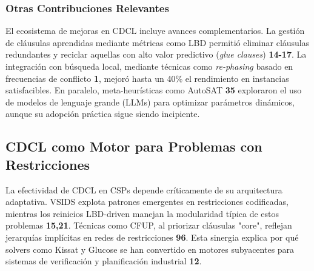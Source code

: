 \subsubsection{Otras Contribuciones Relevantes}
\label{subsubsec:otras-mejoras}

El ecosistema de mejoras en CDCL incluye avances complementarios. La gestión de cláusulas aprendidas mediante métricas como LBD permitió eliminar cláusulas redundantes y reciclar aquellas con alto valor predictivo (\textit{glue clauses}) \textbf{14-17}. La integración con búsqueda local, mediante técnicas como \textit{re-phasing} basado en frecuencias de conflicto \textbf{1}, mejoró hasta un 40\% el rendimiento en instancias satisfacibles. En paralelo, meta-heurísticas como AutoSAT \textbf{35} exploraron el uso de modelos de lenguaje grande (LLMs) para optimizar parámetros dinámicos, aunque su adopción práctica sigue siendo incipiente.


\subsection{CDCL como Motor para Problemas con Restricciones}
La efectividad de CDCL en CSPs depende críticamente de su arquitectura adaptativa. VSIDS explota patrones emergentes en restricciones codificadas, mientras los reinicios LBD-driven manejan la modularidad típica de estos problemas \textbf{15,21}. Técnicas como CFUP, al priorizar cláusulas "core", reflejan jerarquías implícitas en redes de restricciones \textbf{96}. Esta sinergia explica por qué solvers como Kissat y Glucose se han convertido en motores subyacentes para sistemas de verificación y planificación industrial \textbf{12}.


